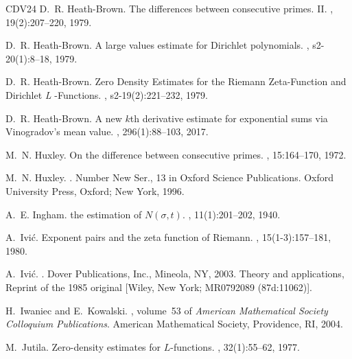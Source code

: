 \documentclass[a4paper, 10pt]{amsart}
\begin{document}
\begin{thebibliography}{CDV24}
D.~R. Heath-Brown.
\newblock The differences between consecutive primes. {II}.
, 19(2):207--220, 1979.

D.~R. Heath-Brown.
\newblock A large values estimate for Dirichlet polynomials.
, s2-20(1):8--18, 1979.

D.~R. Heath-Brown.
\newblock Zero {Density} {Estimates} for the {Riemann} {Zeta}-{Function} and {Dirichlet} \textit{{L}} -{Functions}.
, s2-19(2):221--232, 1979.

D.~R. Heath-Brown.
\newblock A new $k$th derivative estimate for exponential sums via {Vinogradov}'s mean value.
, 296(1):88--103,  2017.


M.~N. Huxley.
\newblock On the difference between consecutive primes.
, 15:164--170, 1972.

M.~N. Huxley.
.
\newblock Number New Ser., 13 in Oxford Science Publications. Oxford University Press, Oxford; New York, 1996.

A.~E. Ingham.
 the estimation of ${N}(\sigma, t)$.
, 11(1):201--202, 1940.

A.~Ivi\'c.
\newblock Exponent pairs and the zeta function of {R}iemann.
, 15(1-3):157--181, 1980.

A.~Ivi\'{c}.
.
\newblock Dover Publications, Inc., Mineola, NY, 2003.
\newblock Theory and applications, Reprint of the 1985 original [Wiley, New York; MR0792089 (87d:11062)].


H.~Iwaniec and E.~Kowalski.
, volume~53 of {\em American Mathematical Society Colloquium Publications}.
\newblock American Mathematical Society, Providence, RI, 2004.



M.~Jutila.
\newblock Zero-density estimates for $L$-functions.
, 32(1):55--62, 1977.



\end{thebibliography}
\end{document}
